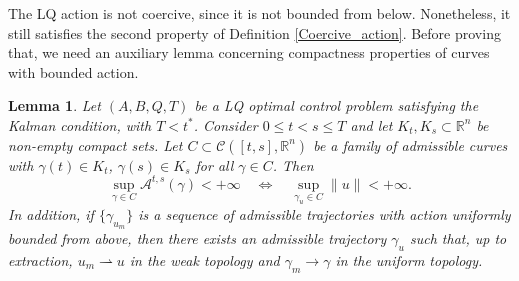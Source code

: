 \documentclass[reqno]{amsart}
\theoremstyle{plain}
\newtheorem{lem}[thm]{Lemma}
\theoremstyle{definition}
\theoremstyle{remark}
\newcommand{\R}{\mathbb{R}}
\begin{document}
	The LQ action is not coercive, since it is not bounded from below. Nonetheless, it still satisfies the second property of Definition \ref{Coercive_action}. Before proving that, we need an auxiliary lemma concerning compactness properties of curves with bounded action.
\begin{lem}\label{coercivity_action_on_controls}
Let $(A,B,Q,T)$ be a LQ optimal control problem satisfying the Kalman condition, with $T<t^*$. Consider $0\leq t<s\leq T$ and let $K_t,K_s\subset \R^n$ be non-empty compact sets. Let $C\subset \mathcal{C}([t,s],\R^n)$ be a family of admissible curves with $\gamma(t)\in K_t$, $\gamma(s)\in K_s$ for all $\gamma \in C$. Then
\begin{equation}\label{eq:iffimplication}
 \sup_{\gamma\in C}   \mathcal{A}^{t,s}(\gamma) < +\infty \quad \iff \quad \sup_{\gamma_u \in C} \|u\| < +\infty.
\end{equation}
In addition, if $\{\gamma_{u_m}\}$ is a sequence of admissible trajectories with action uniformly bounded from above, then there exists an admissible trajectory $\gamma_u$ such that, up to extraction, $u_m \rightharpoonup u$ in the weak topology and $\gamma_m\to \gamma$ in the uniform topology.
\end{lem}
\end{document}
